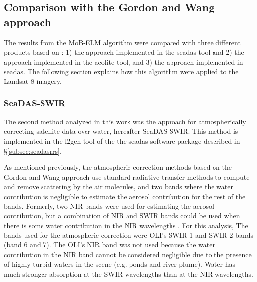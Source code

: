 \subsection{Comparison with the Gordon and Wang approach}
\label{subsec:GordonComp}
The results from the MoB-ELM algorithm were compared with three different products based on \citet{Gordon:1994}: 1) the \citet{Gordon:1994} approach implemented in the \gls{seadas} tool and 2) the \citet{Gordon:1994} approach implemented in the \gls{acolite} tool, and 3) the \citet{Ruddick:2000bs} approach implemented in \gls{seadas}. The following section explains how this algorithm were applied to the Landsat 8 imagery.
\subsubsection{SeaDAS-SWIR}
\label{subsubsec:seadasswir}
The second method analyzed in this work was the \citet{Gordon:1994} approach for atmospherically correcting satellite data over water, hereafter SeaDAS-SWIR. This method is implemented in the l2gen tool of the the \gls{seadas} software package described in \S\ref{subsec:seadasrrs}.


As mentioned previously, the atmospheric correction methods based on the Gordon and Wang approach use standard radiative transfer methods to compute and remove scattering by the air molecules, and two bands where the water contribution is negligible to estimate the aerosol contribution for the rest of the bands. Formerly, two NIR bands were used for estimating the aerosol contribution, but a combination of NIR and SWIR bands could be used when there is some water contribution in the NIR wavelengths \citep{Wang2009}. For this analysis, The bands used for the atmospheric correction were OLI's SWIR 1 and SWIR 2 bands (band 6 and 7). The OLI's NIR band was not used because the water contribution in the NIR band cannot be considered negligible due to the presence of highly turbid waters in the scene (e.g. ponds and river plume). Water has much stronger absorption at the SWIR wavelengths than at the NIR wavelengths. 

